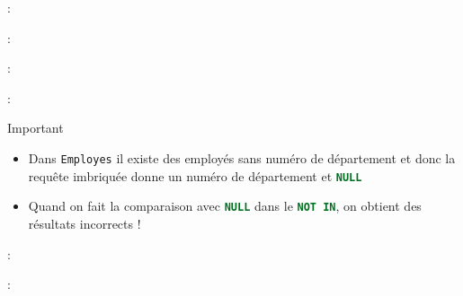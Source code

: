 \documentclass[10pt]{beamer}
\begin{document}
\begin{frame}{\secname : \subsecname}
    
\end{frame}

\begin{frame}{\secname : \subsecname}
    
\end{frame}

\begin{frame}{\secname : \subsecname}
    
\end{frame}

\begin{frame}{\secname : \subsecname}
    \begin{alertblock}{Important}
        \begin{itemize}
            \item Dans \lstinline[language=sql]!Employes! il existe des employés sans numéro de département et donc la requête imbriquée donne un numéro de département et \lstinline[language=sql]!NULL!
            \item Quand on fait la comparaison avec \lstinline[language=sql]!NULL! dans le \lstinline[language=sql]!NOT IN!, on obtient des résultats incorrects !
        \end{itemize}
    \end{alertblock}
\end{frame}

\begin{frame}{\secname : \subsecname}
    
\end{frame}

\begin{frame}{\secname : \subsecname}
    
\end{frame}
\end{document}
